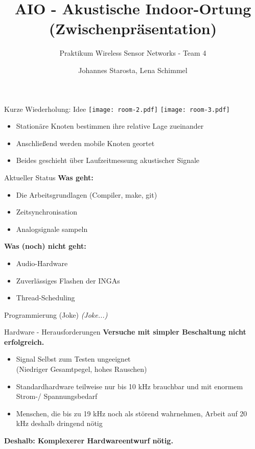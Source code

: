 \documentclass[fleqn,11pt]{beamer}
\title{AIO - Akustische Indoor-Ortung \\(Zwischenpräsentation)}
\subtitle{Praktikum Wireless Sensor Networks - Team 4}
\author{Johannes Starosta, Lena Schimmel}
\begin{document}
\begin{frame}[plain]
\titlepage
\end{frame}

\begin{frame}{Kurze Wiederholung: Idee}
	\texttt{[image: room-2.pdf]}
	\texttt{[image: room-3.pdf]}

	\begin{itemize}
		\item Stationäre Knoten bestimmen ihre relative Lage zueinander
		\item Anschließend werden mobile Knoten geortet
		\item Beides geschieht über Laufzeitmessung akustischer Signale
	\end{itemize}
\end{frame}

\begin{frame}{Aktueller Status}
	\textbf{Was geht:}
	\begin{itemize}
		\item Die Arbeitsgrundlagen (Compiler, make, git)
		\item Zeitsynchronisation
		\item Analogsignale sampeln
	\end{itemize}
	
	\textbf{Was (noch) nicht geht:}
	\begin{itemize}
		\item Audio-Hardware
		\item Zuverlässiges Flashen der INGAs
		\item Thread-Scheduling
	\end{itemize}
\end{frame}

\begin{frame}{Programmierung (Joke)}
	\textit{(Joke...)}
\end{frame}

\begin{frame}{Hardware - Herausforderungen}
	\textbf{Versuche mit simpler Beschaltung nicht erfolgreich.}
	\begin{itemize}
		\item Signal Selbst zum Testen ungeeignet\\(Niedriger Gesamtpegel, hohes Rauschen)
		\item Standardhardware teilweise nur bis 10 kHz brauchbar und mit enormem Strom-/ Spannungsbedarf
		\item Menschen, die bis zu 19 kHz noch als störend wahrnehmen, Arbeit auf 20 kHz deshalb dringend nötig
	\end{itemize}
	
	\textbf{Deshalb: Komplexerer Hardwareentwurf nötig.}
\end{frame}
\end{document}
